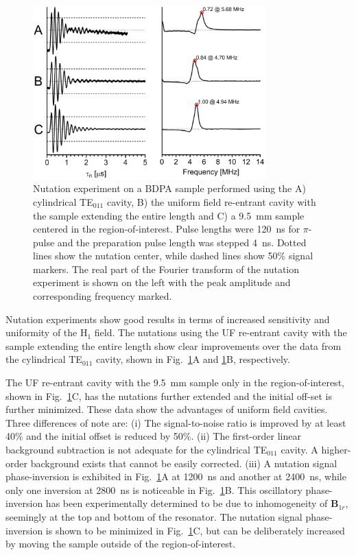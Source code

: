 \begin{figure}[htb]\centering
 \includegraphics[width=0.8\textwidth]{Kapitel/Ch2-Images/06a-Nutation.eps}
 \caption[Nutation experiment comparison.]{Nutation experiment on a BDPA sample performed using the A) cylindrical TE$_{011}$ cavity, B) the uniform field re-entrant \cylTE{} cavity with the sample extending the entire length and C) a 9.5~mm sample centered in the region-of-interest. Pulse lengths were 120~ns for $\pi$-pulse and the preparation pulse length was stepped 4~ns. Dotted lines show the nutation center, while dashed lines show 50\% signal markers. The real part of the Fourier transform of the nutation experiment is shown on the left with the peak amplitude and corresponding frequency marked.}
 \label{Ch2-fig:nutation}
\end{figure}

Nutation experiments show good results in terms of increased sensitivity and uniformity of the H$_1$ field. The nutations using the UF re-entrant \cylTE{} cavity with the sample extending the entire length show clear improvements over the data from the cylindrical TE$_{011}$ cavity, shown in Fig.~\ref{Ch2-fig:nutation}A and \ref{Ch2-fig:nutation}B, respectively. 

The UF re-entrant \cylTE{} cavity with the 9.5~mm sample only in the region-of-interest, shown in Fig.~\ref{Ch2-fig:nutation}C, has the nutations further extended and the initial off-set is further minimized. These data show the advantages of uniform field cavities. Three differences of note are: (i) The signal-to-noise ratio is improved by at least 40\% and the initial offset is reduced by 50\%. (ii) The first-order linear background subtraction is not adequate for the cylindrical TE$_{011}$ cavity. A higher-order background exists that cannot be easily corrected. (iii) A nutation signal phase-inversion is exhibited in  Fig.~\ref{Ch2-fig:nutation}A at 1200~ns and another at 2400~ns, while only one inversion at 2800~ns is noticeable in Fig.~\ref{Ch2-fig:nutation}B. This oscillatory phase-inversion has been experimentally determined to be due to inhomogeneity of $\mathbf{B}_{1r}$, seemingly at the top and bottom of the resonator. The nutation signal phase-inversion is shown to be minimized in Fig.~\ref{Ch2-fig:nutation}C, but can be deliberately increased by moving the sample outside of the region-of-interest.

